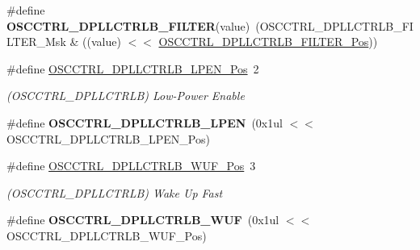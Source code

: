 \begin{DoxyCompactItemize}
\item 
\hypertarget{group___s_a_m_l21___o_s_c_c_t_r_l_ga889bb8f3c1c7e2ef85f84c4a7257bbbc}{}\#define {\bfseries O\+S\+C\+C\+T\+R\+L\+\_\+\+D\+P\+L\+L\+C\+T\+R\+L\+B\+\_\+\+F\+I\+L\+T\+E\+R}(value)~(O\+S\+C\+C\+T\+R\+L\+\_\+\+D\+P\+L\+L\+C\+T\+R\+L\+B\+\_\+\+F\+I\+L\+T\+E\+R\+\_\+\+Msk \& ((value) $<$$<$ \hyperlink{group___s_a_m_l21___o_s_c_c_t_r_l_ga8df5368ebb5161543ef658da3a849a5e}{O\+S\+C\+C\+T\+R\+L\+\_\+\+D\+P\+L\+L\+C\+T\+R\+L\+B\+\_\+\+F\+I\+L\+T\+E\+R\+\_\+\+Pos}))\label{group___s_a_m_l21___o_s_c_c_t_r_l_ga889bb8f3c1c7e2ef85f84c4a7257bbbc}

\item 
\hypertarget{group___s_a_m_l21___o_s_c_c_t_r_l_ga0178fee1ad34873fe05c1a172db28653}{}\#define \hyperlink{group___s_a_m_l21___o_s_c_c_t_r_l_ga0178fee1ad34873fe05c1a172db28653}{O\+S\+C\+C\+T\+R\+L\+\_\+\+D\+P\+L\+L\+C\+T\+R\+L\+B\+\_\+\+L\+P\+E\+N\+\_\+\+Pos}~2\label{group___s_a_m_l21___o_s_c_c_t_r_l_ga0178fee1ad34873fe05c1a172db28653}

\begin{DoxyCompactList}\small\item\em (O\+S\+C\+C\+T\+R\+L\+\_\+\+D\+P\+L\+L\+C\+T\+R\+L\+B) Low-\/\+Power Enable \end{DoxyCompactList}\item 
\hypertarget{group___s_a_m_l21___o_s_c_c_t_r_l_gadf4135c12fae7be3805da84c355c1f21}{}\#define {\bfseries O\+S\+C\+C\+T\+R\+L\+\_\+\+D\+P\+L\+L\+C\+T\+R\+L\+B\+\_\+\+L\+P\+E\+N}~(0x1ul $<$$<$ O\+S\+C\+C\+T\+R\+L\+\_\+\+D\+P\+L\+L\+C\+T\+R\+L\+B\+\_\+\+L\+P\+E\+N\+\_\+\+Pos)\label{group___s_a_m_l21___o_s_c_c_t_r_l_gadf4135c12fae7be3805da84c355c1f21}

\item 
\hypertarget{group___s_a_m_l21___o_s_c_c_t_r_l_ga93ec22d41bd1fbe0745a29b207d8691b}{}\#define \hyperlink{group___s_a_m_l21___o_s_c_c_t_r_l_ga93ec22d41bd1fbe0745a29b207d8691b}{O\+S\+C\+C\+T\+R\+L\+\_\+\+D\+P\+L\+L\+C\+T\+R\+L\+B\+\_\+\+W\+U\+F\+\_\+\+Pos}~3\label{group___s_a_m_l21___o_s_c_c_t_r_l_ga93ec22d41bd1fbe0745a29b207d8691b}

\begin{DoxyCompactList}\small\item\em (O\+S\+C\+C\+T\+R\+L\+\_\+\+D\+P\+L\+L\+C\+T\+R\+L\+B) Wake Up Fast \end{DoxyCompactList}\item 
\hypertarget{group___s_a_m_l21___o_s_c_c_t_r_l_ga9ae87bffdebfee139d362c6492b9b1e3}{}\#define {\bfseries O\+S\+C\+C\+T\+R\+L\+\_\+\+D\+P\+L\+L\+C\+T\+R\+L\+B\+\_\+\+W\+U\+F}~(0x1ul $<$$<$ O\+S\+C\+C\+T\+R\+L\+\_\+\+D\+P\+L\+L\+C\+T\+R\+L\+B\+\_\+\+W\+U\+F\+\_\+\+Pos)\label{group___s_a_m_l21___o_s_c_c_t_r_l_ga9ae87bffdebfee139d362c6492b9b1e3}


\end{DoxyCompactItemize}
